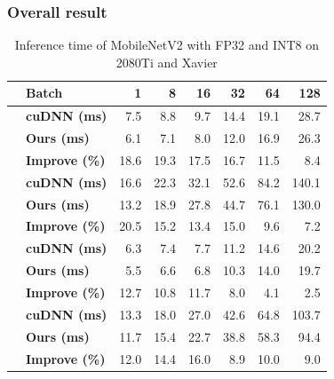 \subsubsection{Overall result}
\begin{table}[]
\setlength{\tabcolsep}{4.4pt}
    \caption{Inference time of MobileNetV2 with FP32 and INT8 on 2080Ti and Xavier}
    \vspace{-3mm}
    \label{tab:infertime}
    \centering
    \begin{threeparttable}
    \begin{tabular}{c|l|rrrrrr}
    \toprule
    &\textbf{Batch} & 1 & 8 & 16& 32 &64 & 128\\
    \midrule
    &\textbf{cuDNN (ms)}   &7.5  &8.8  &9.7  &14.4 &19.1 &28.7 \\
    &\textbf{Ours (ms)}    &6.1  &7.1  &8.0  &12.0 &16.9 &26.3\\
    &\textbf{Improve (\%)} &18.6 &19.3 &17.5 &16.7 &11.5 &8.4 \\
    \hline
    &\textbf{cuDNN (ms)}   &16.6 &22.3 &32.1 &52.6 &84.2 &140.1  \\
    &\textbf{Ours (ms)}    &13.2 &18.9 &27.8 &44.7 &76.1 &130.0 \\
    &\textbf{Improve (\%)} &20.5 &15.2 &13.4 &15.0 &9.6  &7.2 \\
    \hline
    &\textbf{cuDNN (ms)}   &6.3  &7.4  &7.7  &11.2 &14.6 &20.2 \\
    &\textbf{Ours (ms)}    &5.5  &6.6  &6.8  &10.3 &14.0 &19.7\\
    &\textbf{Improve (\%)} &12.7 &10.8 &11.7 &8.0  &4.1  &2.5 \\
    \hline
    &\textbf{cuDNN (ms)}   &13.3 &18.0 &27.0 &42.6 &64.8 &103.7  \\
    &\textbf{Ours (ms)}    &11.7 &15.4 &22.7 &38.8 &58.3 &94.4 \\
    &\textbf{Improve (\%)} &12.0 &14.4 &16.0 &8.9 &10.0  &9.0 \\


    \bottomrule
    \end{tabular}
    \footnotesize
    \end{threeparttable}

\end{table}

